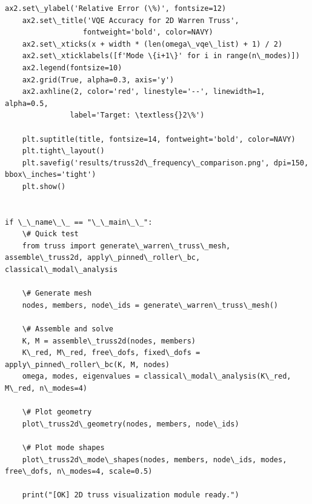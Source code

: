 \documentclass[12pt, a4paper]{article}
\begin{document}
\begin{lstlisting}[style=codestyle, caption={{visualize_truss2d.py --- 2D Warren Truss Visualizations}}]
    ax2.set\_ylabel('Relative Error (\%)', fontsize=12)
    ax2.set\_title('VQE Accuracy for 2D Warren Truss',
                  fontweight='bold', color=NAVY)
    ax2.set\_xticks(x + width * (len(omega\_vqe\_list) + 1) / 2)
    ax2.set\_xticklabels([f'Mode \{i+1\}' for i in range(n\_modes)])
    ax2.legend(fontsize=10)
    ax2.grid(True, alpha=0.3, axis='y')
    ax2.axhline(2, color='red', linestyle='--', linewidth=1, alpha=0.5,
               label='Target: \textless{}2\%')

    plt.suptitle(title, fontsize=14, fontweight='bold', color=NAVY)
    plt.tight\_layout()
    plt.savefig('results/truss2d\_frequency\_comparison.png', dpi=150, bbox\_inches='tight')
    plt.show()


if \_\_name\_\_ == "\_\_main\_\_":
    \# Quick test
    from truss import generate\_warren\_truss\_mesh, assemble\_truss2d, apply\_pinned\_roller\_bc, classical\_modal\_analysis

    \# Generate mesh
    nodes, members, node\_ids = generate\_warren\_truss\_mesh()

    \# Assemble and solve
    K, M = assemble\_truss2d(nodes, members)
    K\_red, M\_red, free\_dofs, fixed\_dofs = apply\_pinned\_roller\_bc(K, M, nodes)
    omega, modes, eigenvalues = classical\_modal\_analysis(K\_red, M\_red, n\_modes=4)

    \# Plot geometry
    plot\_truss2d\_geometry(nodes, members, node\_ids)

    \# Plot mode shapes
    plot\_truss2d\_mode\_shapes(nodes, members, node\_ids, modes, free\_dofs, n\_modes=4, scale=0.5)

    print("[OK] 2D truss visualization module ready.")

\end{lstlisting}

\end{document}
